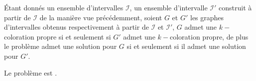 \begin{ncorol}
    \label{equivprecolor}
    Étant donnés un ensemble d'intervalles $\mathcal{I}$, un ensemble d'intervalle $\mathcal{I}'$
    construit à partir de $\mathcal{I}$ de la manière vue précédemment, soient $G$ et $G'$ les
    graphes d'intervalles obtenus respectivement à partir de $\mathcal{I}$ et $\mathcal{I}'$, $G$
    admet une $k-$coloration propre si et seulement si $G'$ admet une $k-$coloration propre, de plus
    le problème \precolor admet une solution pour $G$ si et seulement si il admet une solution pour
    $G'$.
\end{ncorol}

\begin{nthrm}
    Le problème \unitfischedpi est \npc.
\end{nthrm}

